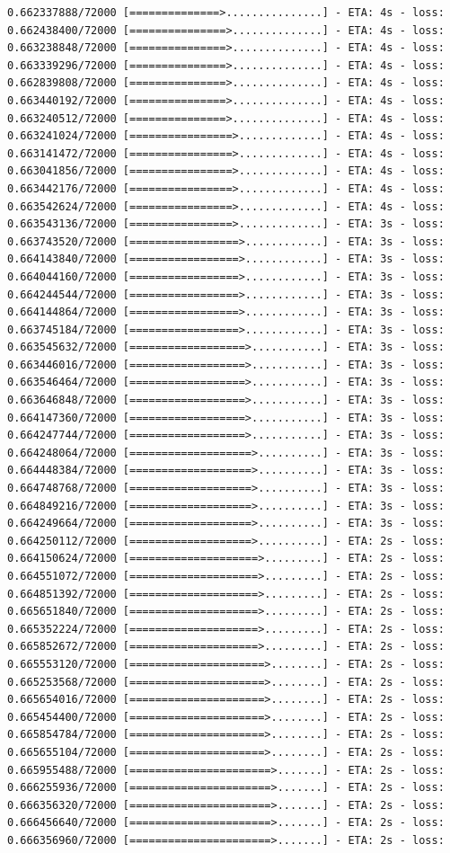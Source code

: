 \documentclass[12pt,fleqn]{article}\usepackage{../../common}
\begin{document}
\begin{verbatim}
0.662337888/72000 [==============>...............] - ETA: 4s - loss: 0.662438400/72000 [===============>..............] - ETA: 4s - loss: 0.663238848/72000 [===============>..............] - ETA: 4s - loss: 0.663339296/72000 [===============>..............] - ETA: 4s - loss: 0.662839808/72000 [===============>..............] - ETA: 4s - loss: 0.663440192/72000 [===============>..............] - ETA: 4s - loss: 0.663240512/72000 [===============>..............] - ETA: 4s - loss: 0.663241024/72000 [================>.............] - ETA: 4s - loss: 0.663141472/72000 [================>.............] - ETA: 4s - loss: 0.663041856/72000 [================>.............] - ETA: 4s - loss: 0.663442176/72000 [================>.............] - ETA: 4s - loss: 0.663542624/72000 [================>.............] - ETA: 4s - loss: 0.663543136/72000 [================>.............] - ETA: 3s - loss: 0.663743520/72000 [=================>............] - ETA: 3s - loss: 0.664143840/72000 [=================>............] - ETA: 3s - loss: 0.664044160/72000 [=================>............] - ETA: 3s - loss: 0.664244544/72000 [=================>............] - ETA: 3s - loss: 0.664144864/72000 [=================>............] - ETA: 3s - loss: 0.663745184/72000 [=================>............] - ETA: 3s - loss: 0.663545632/72000 [==================>...........] - ETA: 3s - loss: 0.663446016/72000 [==================>...........] - ETA: 3s - loss: 0.663546464/72000 [==================>...........] - ETA: 3s - loss: 0.663646848/72000 [==================>...........] - ETA: 3s - loss: 0.664147360/72000 [==================>...........] - ETA: 3s - loss: 0.664247744/72000 [==================>...........] - ETA: 3s - loss: 0.664248064/72000 [===================>..........] - ETA: 3s - loss: 0.664448384/72000 [===================>..........] - ETA: 3s - loss: 0.664748768/72000 [===================>..........] - ETA: 3s - loss: 0.664849216/72000 [===================>..........] - ETA: 3s - loss: 0.664249664/72000 [===================>..........] - ETA: 3s - loss: 0.664250112/72000 [===================>..........] - ETA: 2s - loss: 0.664150624/72000 [====================>.........] - ETA: 2s - loss: 0.664551072/72000 [====================>.........] - ETA: 2s - loss: 0.664851392/72000 [====================>.........] - ETA: 2s - loss: 0.665651840/72000 [====================>.........] - ETA: 2s - loss: 0.665352224/72000 [====================>.........] - ETA: 2s - loss: 0.665852672/72000 [====================>.........] - ETA: 2s - loss: 0.665553120/72000 [=====================>........] - ETA: 2s - loss: 0.665253568/72000 [=====================>........] - ETA: 2s - loss: 0.665654016/72000 [=====================>........] - ETA: 2s - loss: 0.665454400/72000 [=====================>........] - ETA: 2s - loss: 0.665854784/72000 [=====================>........] - ETA: 2s - loss: 0.665655104/72000 [=====================>........] - ETA: 2s - loss: 0.665955488/72000 [======================>.......] - ETA: 2s - loss: 0.666255936/72000 [======================>.......] - ETA: 2s - loss: 0.666356320/72000 [======================>.......] - ETA: 2s - loss: 0.666456640/72000 [======================>.......] - ETA: 2s - loss: 0.666356960/72000 [======================>.......] - ETA: 2s - loss: 
\end{verbatim}
\end{document}
